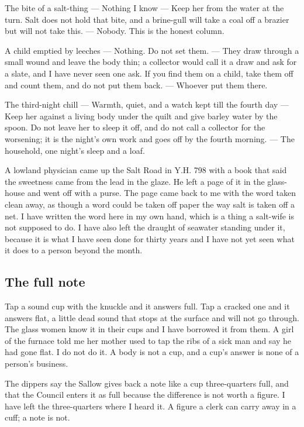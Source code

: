\documentclass{design/chronicle}
\begin{document}
The bite of a salt-thing — Nothing I know — Keep her from the water at the turn. Salt does not hold that bite, and a brine-gull will take a coal off a brazier but will not take this. — Nobody. This is the honest column.\par

A child emptied by leeches — Nothing. Do not set them. — They draw through a small wound and leave the body thin; a collector would call it a draw and ask for a slate, and I have never seen one ask. If you find them on a child, take them off and count them, and do not put them back. — Whoever put them there.\par

The third-night chill — Warmth, quiet, and a watch kept till the fourth day — Keep her against a living body under the quilt and give barley water by the spoon. Do not leave her to sleep it off, and do not call a collector for the worsening; it is the night’s own work and goes off by the fourth morning. — The household, one night’s sleep and a loaf.\par

A lowland physician came up the Salt Road in Y.H. 798 with a book that said the sweetness came from the lead in the glaze. He left a page of it in the glass-house and went off with a purse. The page came back to me with the word taken clean away, as though a word could be taken off paper the way salt is taken off a net. I have written the word here in my own hand, which is a thing a salt-wife is not supposed to do. I have also left the draught of seawater standing under it, because it is what I have seen done for thirty years and I have not yet seen what it does to a person beyond the month.

\subsection*{The full note}

Tap a sound cup with the knuckle and it answers full. Tap a cracked one and it answers flat, a little dead sound that stops at the surface and will not go through. The glass women know it in their cups and I have borrowed it from them. A girl of the furnace told me her mother used to tap the ribs of a sick man and say he had gone flat. I do not do it. A body is not a cup, and a cup’s answer is none of a person’s business.

The dippers say the Sallow gives back a note like a cup three-quarters full, and that the Council enters it as full because the difference is not worth a figure. I have left the three-quarters where I heard it. A figure a clerk can carry away in a cuff; a note is not.
\end{document}
